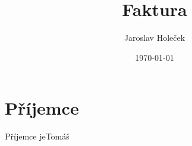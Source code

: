 \documentclass{article}
\title{Faktura}
\author{Jaroslav Holeček}
\date{\today}
\begin{document}
\maketitle

\section{Příjemce}

Příjemce jeTomáš
\end{document}
